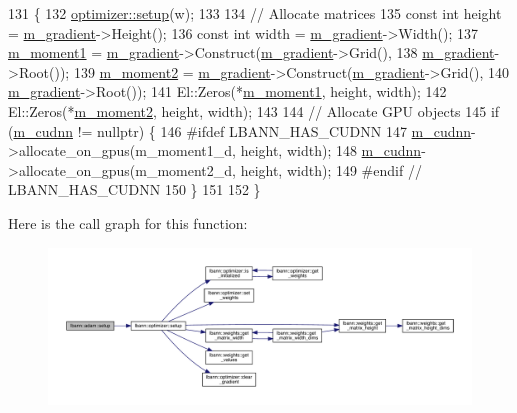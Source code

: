\begin{DoxyCode}
131                            \{
132   \hyperlink{classlbann_1_1optimizer_a7641a88b3c166df2d974a298622b992b}{optimizer::setup}(w);
133 
134   \textcolor{comment}{// Allocate matrices}
135   \textcolor{keyword}{const} \textcolor{keywordtype}{int} height = \hyperlink{classlbann_1_1optimizer_a3df20cb0ae2b60430ad4fd235d66c12e}{m\_gradient}->Height();
136   \textcolor{keyword}{const} \textcolor{keywordtype}{int} width = \hyperlink{classlbann_1_1optimizer_a3df20cb0ae2b60430ad4fd235d66c12e}{m\_gradient}->Width();
137   \hyperlink{classlbann_1_1adam_aa10a518a5356257bc69e655b88b0ed67}{m\_moment1} = \hyperlink{classlbann_1_1optimizer_a3df20cb0ae2b60430ad4fd235d66c12e}{m\_gradient}->Construct(\hyperlink{classlbann_1_1optimizer_a3df20cb0ae2b60430ad4fd235d66c12e}{m\_gradient}->Grid(),
138                                     \hyperlink{classlbann_1_1optimizer_a3df20cb0ae2b60430ad4fd235d66c12e}{m\_gradient}->Root());
139   \hyperlink{classlbann_1_1adam_aea3295a0ee7da5e9c56fd6ff2f05c63f}{m\_moment2} = \hyperlink{classlbann_1_1optimizer_a3df20cb0ae2b60430ad4fd235d66c12e}{m\_gradient}->Construct(\hyperlink{classlbann_1_1optimizer_a3df20cb0ae2b60430ad4fd235d66c12e}{m\_gradient}->Grid(),
140                                     \hyperlink{classlbann_1_1optimizer_a3df20cb0ae2b60430ad4fd235d66c12e}{m\_gradient}->Root());
141   El::Zeros(*\hyperlink{classlbann_1_1adam_aa10a518a5356257bc69e655b88b0ed67}{m\_moment1}, height, width);
142   El::Zeros(*\hyperlink{classlbann_1_1adam_aea3295a0ee7da5e9c56fd6ff2f05c63f}{m\_moment2}, height, width);
143 
144   \textcolor{comment}{// Allocate GPU objects}
145   \textcolor{keywordflow}{if} (\hyperlink{classlbann_1_1optimizer_a2f24dbeaca18b06f4aa7d179bbf96680}{m\_cudnn} != \textcolor{keyword}{nullptr}) \{
146 \textcolor{preprocessor}{#ifdef LBANN\_HAS\_CUDNN}
147     \hyperlink{classlbann_1_1optimizer_a2f24dbeaca18b06f4aa7d179bbf96680}{m\_cudnn}->allocate\_on\_gpus(m\_moment1\_d, height, width);
148     \hyperlink{classlbann_1_1optimizer_a2f24dbeaca18b06f4aa7d179bbf96680}{m\_cudnn}->allocate\_on\_gpus(m\_moment2\_d, height, width);
149 \textcolor{preprocessor}{#endif // LBANN\_HAS\_CUDNN}
150   \}
151 
152 \}
\end{DoxyCode}
Here is the call graph for this function\+:\nopagebreak
\begin{figure}[H]
\begin{center}
\leavevmode
\includegraphics[width=350pt]{classlbann_1_1adam_aea0b1fa44197fe184a6feca5ec5c808e_cgraph}
\end{center}
\end{figure}
